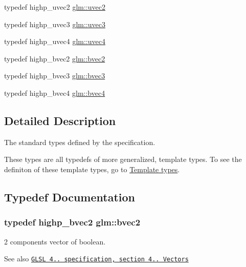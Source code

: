 \begin{DoxyCompactItemize}
\item 
typedef highp\+\_\+uvec2 \hyperlink{group__core__types_gafd2041b45eff671aa8899d2c2835eee9}{glm\+::uvec2}
\item 
typedef highp\+\_\+uvec3 \hyperlink{group__core__types_gac4ba593917841b859ba1683b8b52b8fa}{glm\+::uvec3}
\item 
typedef highp\+\_\+uvec4 \hyperlink{group__core__types_ga1c426d19627b32b14f0089f7f4ba7b1d}{glm\+::uvec4}
\item 
typedef highp\+\_\+bvec2 \hyperlink{group__core__types_ga7523cf292181cf7daef3aa0a3267d8e3}{glm\+::bvec2}
\item 
typedef highp\+\_\+bvec3 \hyperlink{group__core__types_ga3f07d6d37fc6fe875170fd5799685bcf}{glm\+::bvec3}
\item 
typedef highp\+\_\+bvec4 \hyperlink{group__core__types_ga6bb211b3d3bebae3867548d5673ca5cd}{glm\+::bvec4}
\end{DoxyCompactItemize}


\subsection{Detailed Description}
The standard types defined by the specification. 

These types are all typedefs of more generalized, template types. To see the definiton of these template types, go to \hyperlink{group__core__template}{Template types}. 

\subsection{Typedef Documentation}
\subsubsection[{\texorpdfstring{bvec2}{bvec2}}]{\setlength{\rightskip}{0pt plus 5cm}typedef highp\+\_\+bvec2 {\bf glm\+::bvec2}}\hypertarget{group__core__types_ga7523cf292181cf7daef3aa0a3267d8e3}{}\label{group__core__types_ga7523cf292181cf7daef3aa0a3267d8e3}
2 components vector of boolean.

\begin{DoxySeeAlso}{See also}
\href{http://www.opengl.org/registry/doc/GLSLangSpec.4.20.8.pdf}{\tt G\+L\+SL 4.. specification, section 4.. Vectors} 
\end{DoxySeeAlso}
